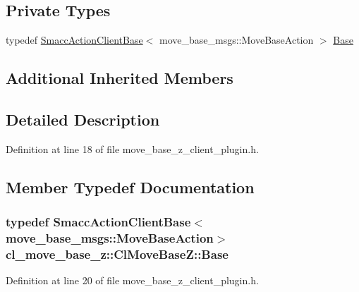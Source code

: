\subsection*{Private Types}
\begin{DoxyCompactItemize}
\item 
typedef \hyperlink{classsmacc_1_1client__bases_1_1SmaccActionClientBase_af38f27dd26f8a87fea6b3eaa4a84e604}{Smacc\+Action\+Client\+Base}$<$ move\+\_\+base\+\_\+msgs\+::\+Move\+Base\+Action $>$ \hyperlink{classcl__move__base__z_1_1ClMoveBaseZ_a5e67ee7220b881368468613fa060b664}{Base}
\end{DoxyCompactItemize}
\subsection*{Additional Inherited Members}


\subsection{Detailed Description}


Definition at line 18 of file move\+\_\+base\+\_\+z\+\_\+client\+\_\+plugin.\+h.



\subsection{Member Typedef Documentation}
\subsubsection[{\texorpdfstring{Base}{Base}}]{\setlength{\rightskip}{0pt plus 5cm}typedef {\bf Smacc\+Action\+Client\+Base}$<$move\+\_\+base\+\_\+msgs\+::\+Move\+Base\+Action$>$ {\bf cl\+\_\+move\+\_\+base\+\_\+z\+::\+Cl\+Move\+Base\+Z\+::\+Base}\hspace{0.3cm}{\ttfamily [private]}}\hypertarget{classcl__move__base__z_1_1ClMoveBaseZ_a5e67ee7220b881368468613fa060b664}{}\label{classcl__move__base__z_1_1ClMoveBaseZ_a5e67ee7220b881368468613fa060b664}


Definition at line 20 of file move\+\_\+base\+\_\+z\+\_\+client\+\_\+plugin.\+h.


